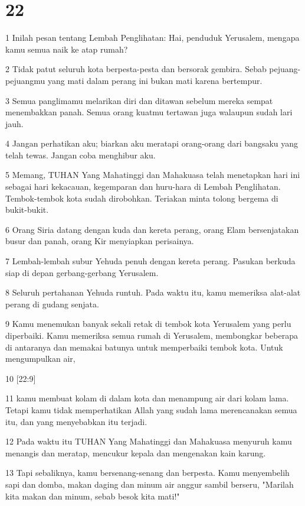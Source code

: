\chapter{22}

\par 1 Inilah pesan tentang Lembah Penglihatan: Hai, penduduk Yerusalem, mengapa kamu semua naik ke atap rumah?
\par 2 Tidak patut seluruh kota berpesta-pesta dan bersorak gembira. Sebab pejuang-pejuangmu yang mati dalam perang ini bukan mati karena bertempur.
\par 3 Semua panglimamu melarikan diri dan ditawan sebelum mereka sempat menembakkan panah. Semua orang kuatmu tertawan juga walaupun sudah lari jauh.
\par 4 Jangan perhatikan aku; biarkan aku meratapi orang-orang dari bangsaku yang telah tewas. Jangan coba menghibur aku.
\par 5 Memang, TUHAN Yang Mahatinggi dan Mahakuasa telah menetapkan hari ini sebagai hari kekacauan, kegemparan dan huru-hara di Lembah Penglihatan. Tembok-tembok kota sudah dirobohkan. Teriakan minta tolong bergema di bukit-bukit.
\par 6 Orang Siria datang dengan kuda dan kereta perang, orang Elam bersenjatakan busur dan panah, orang Kir menyiapkan perisainya.
\par 7 Lembah-lembah subur Yehuda penuh dengan kereta perang. Pasukan berkuda siap di depan gerbang-gerbang Yerusalem.
\par 8 Seluruh pertahanan Yehuda runtuh. Pada waktu itu, kamu memeriksa alat-alat perang di gudang senjata.
\par 9 Kamu menemukan banyak sekali retak di tembok kota Yerusalem yang perlu diperbaiki. Kamu memeriksa semua rumah di Yerusalem, membongkar beberapa di antaranya dan memakai batunya untuk memperbaiki tembok kota. Untuk mengumpulkan air,
\par 10 [22:9]
\par 11 kamu membuat kolam di dalam kota dan menampung air dari kolam lama. Tetapi kamu tidak memperhatikan Allah yang sudah lama merencanakan semua itu, dan yang menyebabkan itu terjadi.
\par 12 Pada waktu itu TUHAN Yang Mahatinggi dan Mahakuasa menyuruh kamu menangis dan meratap, mencukur kepala dan mengenakan kain karung.
\par 13 Tapi sebaliknya, kamu bersenang-senang dan berpesta. Kamu menyembelih sapi dan domba, makan daging dan minum air anggur sambil berseru, "Marilah kita makan dan minum, sebab besok kita mati!"
